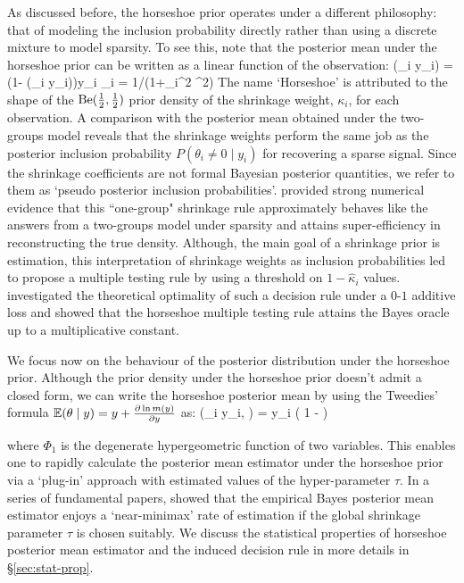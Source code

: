 \documentclass[11pt]{article}
\begin{document}
As discussed before, the horseshoe prior operates under a different philosophy: that of modeling the inclusion probability directly rather than using a discrete mixture to model sparsity. To see this, note that the posterior mean under the horseshoe prior can be written as a linear function of the observation:
\beq
\E(\theta_i \mid y_i) = (1- \E(\kappa_i \mid y_i))y_i  \kappa_i = 1/(1+\lambda_i^2 \tau^2)
\eeq
The name `Horseshoe' is attributed to the shape of the ${\rm Be} (\frac{1}{2},
\frac{1}{2})$ prior density of the shrinkage weight, $\kappa_i$, for each
observation. A comparison with the posterior mean obtained under the two-groups
model reveals that the shrinkage weights perform the same job as the posterior
inclusion probability $P(\theta_i \ne 0 \mid y_i)$ for recovering a sparse
signal. Since the shrinkage coefficients are not formal Bayesian posterior
quantities, we refer to them as `pseudo posterior inclusion probabilities'.
\citet{carvalho2010horseshoe} provided strong numerical evidence that this
``one-group" shrinkage rule approximately behaves like the answers from a
two-groups model under sparsity and attains super-efficiency in reconstructing
the true density. Although, the main goal of a shrinkage prior is estimation,
this interpretation of shrinkage weights as inclusion probabilities led
\citet{carvalho2010horseshoe} to propose a multiple testing rule by using a
threshold on $1-\hat{\kappa}_i$ values. \citet{datta2013asymptotic}
investigated the theoretical optimality of such a decision rule under a $0$-$1$
additive loss and showed that the horseshoe multiple testing rule attains the
Bayes oracle up to a multiplicative constant. 

We focus now on the behaviour of the posterior distribution under the
horseshoe prior. Although the prior density under the horseshoe prior doesn't
admit a closed form, we can write the horseshoe posterior mean by using the
Tweedies' formula $\mathbb E(\theta \mid y) = y + \frac{\partial \ln m(y)}{\partial y}$ as: 
\beq
\E(\theta_i \mid y_i, \tau) = y_i \left( 1 -  \right)
\eeq

where $\Phi_1$ is the degenerate hypergeometric function of two variables. This enables one to rapidly calculate the posterior mean estimator under the horseshoe prior via a `plug-in' approach with estimated values of the hyper-parameter $\tau$. In a series of fundamental papers, \citet{van2014horseshoe} showed that the empirical Bayes posterior mean estimator enjoys  a `near-minimax' rate of estimation if the global shrinkage parameter $\tau$ is chosen suitably. We discuss the statistical properties of horseshoe posterior mean estimator and the induced decision rule in more details in \S \ref{sec:stat-prop}. 
\end{document}
